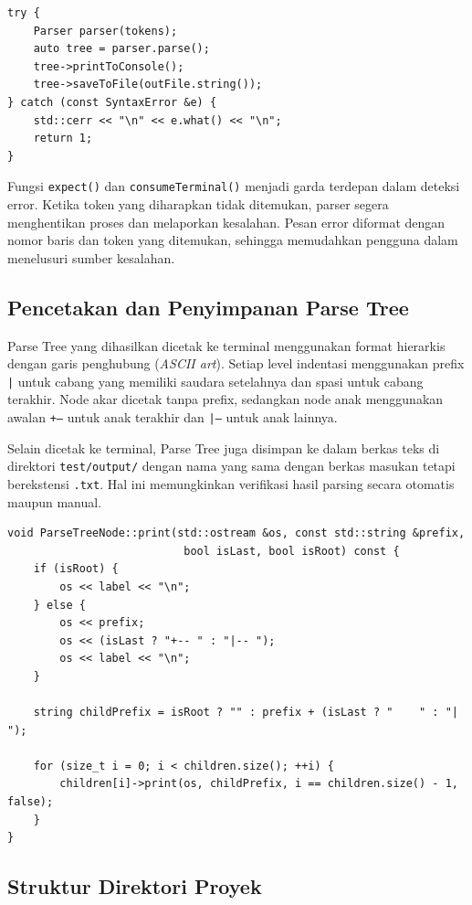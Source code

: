 \documentclass[12pt,a4paper]{article}
\begin{document}
\begin{lstlisting}[style=cpp, caption={Penanganan error di main.cpp}]
try {
    Parser parser(tokens);
    auto tree = parser.parse();
    tree->printToConsole();
    tree->saveToFile(outFile.string());
} catch (const SyntaxError &e) {
    std::cerr << "\n" << e.what() << "\n";
    return 1;
}
\end{lstlisting}

Fungsi \texttt{expect()} dan \texttt{consumeTerminal()} menjadi garda terdepan dalam deteksi error. Ketika token yang diharapkan tidak ditemukan, parser segera menghentikan proses dan melaporkan kesalahan. Pesan error diformat dengan nomor baris dan token yang ditemukan, sehingga memudahkan pengguna dalam menelusuri sumber kesalahan.

\subsection{Pencetakan dan Penyimpanan Parse Tree}

Parse Tree yang dihasilkan dicetak ke terminal menggunakan format hierarkis dengan garis penghubung (\textit{ASCII art}). Setiap level indentasi menggunakan prefix \texttt{|} untuk cabang yang memiliki saudara setelahnya dan spasi untuk cabang terakhir. Node akar dicetak tanpa prefix, sedangkan node anak menggunakan awalan \texttt{+--} untuk anak terakhir dan \texttt{|--} untuk anak lainnya.

Selain dicetak ke terminal, Parse Tree juga disimpan ke dalam berkas teks di direktori \texttt{test/output/} dengan nama yang sama dengan berkas masukan tetapi berekstensi \texttt{.txt}. Hal ini memungkinkan verifikasi hasil parsing secara otomatis maupun manual.

\begin{lstlisting}[style=cpp, caption={Fungsi pencetakan Parse Tree}]
void ParseTreeNode::print(std::ostream &os, const std::string &prefix,
                           bool isLast, bool isRoot) const {
    if (isRoot) {
        os << label << "\n";
    } else {
        os << prefix;
        os << (isLast ? "+-- " : "|-- ");
        os << label << "\n";
    }

    string childPrefix = isRoot ? "" : prefix + (isLast ? "    " : "|   ");

    for (size_t i = 0; i < children.size(); ++i) {
        children[i]->print(os, childPrefix, i == children.size() - 1, false);
    }
}
\end{lstlisting}

\subsection{Struktur Direktori Proyek}
\end{document}
